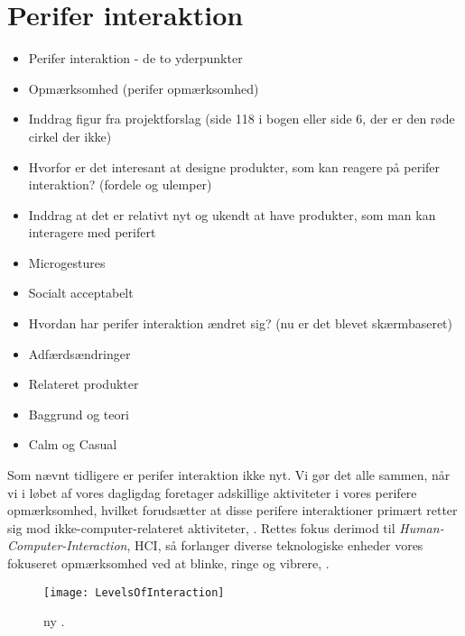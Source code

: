 \chapter{Perifer interaktion}
\label{PeriferInteratkion}
%
\begin{itemize}
  \item Perifer interaktion - de to yderpunkter
  \item Opmærksomhed (perifer opmærksomhed)
  \item Inddrag figur fra projektforslag (side 118 i bogen eller side 6, der er den røde cirkel der ikke)
  \item Hvorfor er det interesant at designe produkter, som kan reagere på perifer interaktion? (fordele og ulemper) 
  \item Inddrag at det er relativt nyt og ukendt at have produkter, som man kan interagere med perifert 
  \item Microgestures 
  \item Socialt acceptabelt 
  \item Hvordan har perifer interaktion ændret sig? (nu er det blevet skærmbaseret)
  \item Adfærdsændringer
  \item Relateret produkter  
  \item Baggrund og teori
  \item Calm og Casual
\end{itemize}
%
Som nævnt tidligere er perifer interaktion ikke nyt. Vi gør det alle sammen, når vi i løbet af vores dagligdag foretager adskillige aktiviteter i vores perifere opmærksomhed, hvilket forudsætter at disse perifere interaktioner primært retter sig mod ikke-computer-relateret aktiviteter, \parencite[s. 1]{PDF:PeripheralInteraction}. Rettes fokus derimod til \textit{Human-Computer-Interaction}, HCI, så forlanger diverse teknologiske enheder vores fokuseret opmærksomhed ved at blinke, ringe og vibrere, \parencite[s. 1]{PDF:PeripheralInteraction}.    
%
\begin{figure}[H]
	\centering
	\texttt{[image: LevelsOfInteraction]}
	\caption{ny \textcite[s. 118]{PDF:PeripheralInteraction}.}
	\label{fig:LevelsOfInteraction}
\end{figure}
\noindent
%